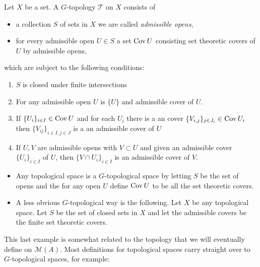 \begin{definition}
	[$G$-topology]
	Let $X$ be a set. 
	A $G$-topology $\mathcal{T} $ on $X $ consists of 
	\begin{itemize}
		\item  a collection $S$ of sets in $X$ we are called \emph{admissible opens},
		\item for every admissible open $U \in S$ a set $\operatorname{Cov} U$ consisting set theoretic covers of $U$ by admissible opens,
	\end{itemize}
	which are subject to the following conditions:
	\begin{enumerate}
		\item $S$ is closed under finite intersections
		\item For any admissible open $U$ is $\{U\}$ and admissible cover of $U$.
		\item If $\{U_i\}_{i \in I} \in \operatorname{Cov} U $ and for each $U_i$ there is a an cover $\{V_{i, j}\}_{j \in J_i} \in \operatorname{Cov} U_i$ then $\{V_{ij}\} _{i \in I, j \in J}$ is a an admissible cover of $U$
		\item If  $U, V$ are admissible opens with $V \subset  U$ and given an admissible cover $\{U_i\}_{i \in I} $ of $U$, then $\{V \cap U_i\} _{i \in I}$ is an admissible cover of $V$. 
	\end{enumerate}
\end{definition}
\begin{example}
	\begin{itemize}
		\item Any topological space is a $G$-topological space by letting $S$ be the set of opens and the for any open  $U$ define $\operatorname{Cov} U$ to be all the set theoretic covers. 
		\item A less obvious $G$-topological way is the following. 
			Let $X$ be any topological space. 
			Let $S$ be the set of closed sets in $X$ and let the admissible covers be the finite set theoretic covers. 
	\end{itemize}
\end{example}
This last example is somewhat related to the topology that we will eventually define on $\mathcal{M} (A)$. 
Most definitions for topological spaces carry straight over to $G$-topological spaces, for example: 
